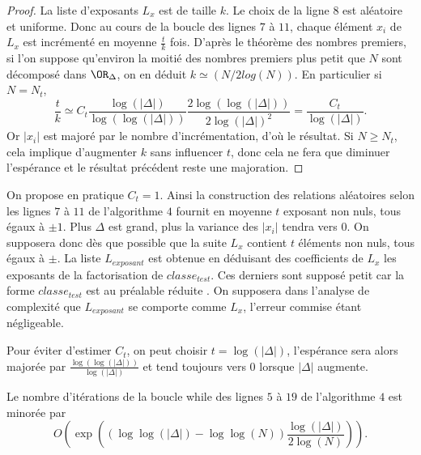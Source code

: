 \begin{proof}
	La liste d'exposants $L_{x}$ est de taille $k$. Le choix de la ligne $8$ est aléatoire et uniforme. Donc au cours de la boucle des lignes $7$ à $11$, chaque élément $x_{i}$ de $L_{x}$ est incrémenté en moyenne $\frac{t}{k}$ fois. D'après le théorème des nombres premiers, si l'on suppose qu'environ la moitié des nombres premiers plus petit que $N$ sont décomposé dans $\OR_{\Delta}$, on en déduit $k \simeq (N/2log(N))$. En particulier si $N = N_{t}$,
	\begin{equation*}
		\frac{t}{k} \simeq C_{t}\frac{\log\left( |\Delta|\right)}{\log\left( \log\left( |\Delta|\right) \right)}\frac{2\log(\log(|\Delta|))}{2\log(|\Delta|)^2} = \frac{C_{t}}{\log(|\Delta|)}.
	\end{equation*}
	Or $|x_{i}|$ est majoré par le nombre d'incrémentation, d'où le résultat. Si $N \geq N_{t}$, cela implique d'augmenter $k$ sans influencer $t$, donc cela ne fera que diminuer l'espérance et le résultat précédent reste une majoration. 
\end{proof}

\begin{Rem}
	On propose en pratique $C_{t} = 1$. Ainsi la construction des relations aléatoires selon les lignes $7$ à $11$ de l'algorithme $4$ fournit en moyenne $t$ exposant non nuls, tous égaux à $\pm 1$. Plus $\Delta$ est grand, plus la variance des $|x_{i}|$ tendra vers $0$. On supposera donc dès que possible que la suite $L_{x}$ contient $t$ éléments non nuls, tous égaux à $\pm$. La liste $L_{exposant}$ est obtenue en déduisant des coefficients de $L_{x}$ les exposants de la factorisation de $classe_{test}$. Ces derniers sont supposé petit car la forme $classe_{test}$ est au préalable réduite \cite{JaoSoukharev}. On supposera dans l'analyse de complexité que $L_{exposant}$ se comporte comme $L_{x}$, l'erreur commise étant négligeable. 
\end{Rem}

\begin{Rem}
	Pour éviter d'estimer $C_{t}$, on peut choisir $t = \log(|\Delta|)$, l'espérance sera alors majorée par $\frac{\log(\log(|\Delta|))}{\log(|\Delta|)}$ et tend toujours vers $0$ lorsque $|\Delta|$ augmente. 
\end{Rem}

\begin{Prop}
	Le nombre d'itérations de la boucle while des lignes $5$ à $19$ de l'algorithme $4$ est minorée par 
	\begin{equation*}
		O\left( \exp \left( \left( \log\log\left(|\Delta| \right) - \log\log\left( N \right)  \right)\frac{\log\left(|\Delta| \right)}{2\log\left( N \right)} \right) \right).
	\end{equation*}
\end{Prop}

